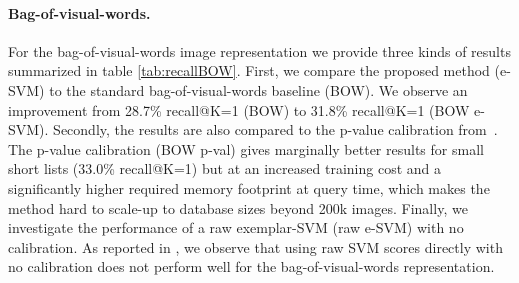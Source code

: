 \documentclass[10pt,twocolumn,letterpaper]{article}
\begin{document}
      \paragraph{Bag-of-visual-words.}
            For the bag-of-visual-words image representation we provide three kinds of results summarized in table \ref{tab:recallBOW}. First, we compare the proposed method (e-SVM) to the standard bag-of-visual-words baseline (BOW). We observe an improvement from 28.7\% recall@K=1 (BOW) to 31.8\% recall@K=1 (BOW e-SVM). Secondly, the results are also compared to the p-value calibration from~\cite{Gronat13}. The p-value calibration (BOW p-val) gives marginally better results for small short lists (33.0\% recall@K=1) but at an increased training cost and a significantly higher required memory footprint at query time, which makes the method hard to scale-up to database sizes beyond 200k images. Finally, we investigate the performance of a raw exemplar-SVM (raw e-SVM) with no calibration. As reported in \cite{Gronat13}, we observe that using raw SVM scores directly with no calibration does not perform well for the bag-of-visual-words representation. %
            \begin{table}[t]
               \begin{centering}
                  
               \caption{ \textbf{Results on Pittsburgh 25k dataset - bag-of-visual-words.}
                     The fraction of correctly recognized queries (recall@K)
                        in the top $K\in\{1,2,5,10,20\}$ retrieved images.
                     The learnt descriptors by the proposed method (BOW e-SVM) marginally improve over the raw bag-of-visual-words descriptors (BOW).
               }
               \label{tab:recallBOW}
               \end{centering}
            \end{table}
\end{document}
